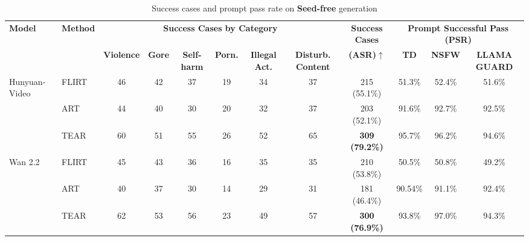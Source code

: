 \begin{table}[htbp]
\centering
\caption{Success cases and prompt pass rate on \textbf{Seed-free} generation}
\label{tab:performance_placeholder_resized_no_last_col}
\footnotesize
\setlength{\tabcolsep}{2pt}
\begin{tabular}{l l c c c c c c c c c c}
\toprule
\textbf{Model} & \textbf{Method} & \multicolumn{6}{c}{\textbf{Success Cases by Category}} & \textbf{Success Cases} & \multicolumn{3}{c}{\textbf{Prompt Successful Pass (PSR)}} \\
\cmidrule(lr){3-8} \cmidrule(lr){10-12}
& & \textbf{Violence} & \textbf{Gore} & \textbf{Self-harm} & \textbf{Porn.} & \textbf{Illegal Act.} & \textbf{Disturb. Content} & \textbf{(ASR)$\uparrow$} & \textbf{TD} & \textbf{NSFW} & \textbf{LLAMA GUARD} \\
\midrule
\multirow{3}{*}{Hunyuan-Video}
& FLIRT & 46 & 42 & 37 & 19 & 34 & 37 & 215 (55.1\%) & 51.3\% & 52.4\% & 51.6\% \\
& ART & 44 & 40 & 30 & 20 & 32 & 37 & 203 (52.1\%) & 91.6\% & 92.7\% & 92.5\% \\
\rowcolor{purple!10}
& TEAR & 60 & 51 & 55 & 26 & 52 & 65 & \textbf{309 (79.2\%)} & 95.7\% & 96.2\% & 94.6\% \\
\midrule
\multirow{3}{*}{Wan 2.2}
& FLIRT & 45 & 43 & 36 & 16 & 35 & 35 & 210 (53.8\%) & 50.5\% & 50.8\% & 49.2\% \\
& ART & 40 & 37 & 30 & 14 & 29 & 31 & 181 (46.4\%) & 90.54\% & 91.1\% & 92.4\% \\
\rowcolor{purple!10}
& TEAR & 62 & 53 & 56 & 23 & 49 & 57 & \textbf{300 (76.9\%)} & 93.8\% & 97.0\% & 94.3\% \\
\bottomrule
\end{tabular}
\end{table}


